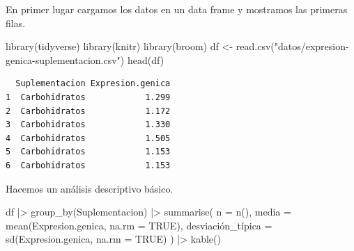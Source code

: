 \documentclass[
  a4paper,
]{scrreport}
\newenvironment{Shaded}{\begin{snugshade}}{\end{snugshade}}
\newcommand{\AttributeTok}[1]{\textcolor[rgb]{0.40,0.45,0.13}{#1}}
\newcommand{\ConstantTok}[1]{\textcolor[rgb]{0.56,0.35,0.01}{#1}}
\newcommand{\FunctionTok}[1]{\textcolor[rgb]{0.28,0.35,0.67}{#1}}
\newcommand{\NormalTok}[1]{\textcolor[rgb]{0.00,0.23,0.31}{#1}}
\newcommand{\OtherTok}[1]{\textcolor[rgb]{0.00,0.23,0.31}{#1}}
\newcommand{\SpecialCharTok}[1]{\textcolor[rgb]{0.37,0.37,0.37}{#1}}
\newcommand{\StringTok}[1]{\textcolor[rgb]{0.13,0.47,0.30}{#1}}
\theoremstyle{definition}
\theoremstyle{remark}
\begin{document}
\begin{tcolorbox}[enhanced jigsaw, breakable, opacityback=0, colbacktitle=quarto-callout-tip-color!10!white, colframe=quarto-callout-tip-color-frame, left=2mm, titlerule=0mm, coltitle=black, colback=white, bottomtitle=1mm, toptitle=1mm, opacitybacktitle=0.6, title=\textcolor{quarto-callout-tip-color}{\faLightbulb}\hspace{0.5em}{Solución}, leftrule=.75mm, bottomrule=.15mm, toprule=.15mm, rightrule=.15mm, arc=.35mm]

En primer lugar cargamos los datos en un data frame y mostramos las
primeras filas.

\begin{Shaded}
\begin{Highlighting}[]
\FunctionTok{library}\NormalTok{(tidyverse)}
\FunctionTok{library}\NormalTok{(knitr)}
\FunctionTok{library}\NormalTok{(broom)}
\NormalTok{df }\OtherTok{\textless{}{-}} \FunctionTok{read.csv}\NormalTok{(}\StringTok{"datos/expresion{-}genica{-}suplementacion.csv"}\NormalTok{)}
\FunctionTok{head}\NormalTok{(df)}
\end{Highlighting}
\end{Shaded}

\begin{verbatim}
  Suplementacion Expresion.genica
1  Carbohidratos            1.299
2  Carbohidratos            1.172
3  Carbohidratos            1.330
4  Carbohidratos            1.505
5  Carbohidratos            1.153
6  Carbohidratos            1.153
\end{verbatim}

Hacemos un análisis descriptivo básico.

\begin{Shaded}
\begin{Highlighting}[]
\NormalTok{df }\SpecialCharTok{|\textgreater{}} 
    \FunctionTok{group\_by}\NormalTok{(Suplementacion) }\SpecialCharTok{|\textgreater{}} 
    \FunctionTok{summarise}\NormalTok{(}
        \AttributeTok{n =} \FunctionTok{n}\NormalTok{(),}
        \AttributeTok{media =} \FunctionTok{mean}\NormalTok{(Expresion.genica, }\AttributeTok{na.rm =} \ConstantTok{TRUE}\NormalTok{),}
\NormalTok{        desviación\_típica }\OtherTok{=} \FunctionTok{sd}\NormalTok{(Expresion.genica, }\AttributeTok{na.rm =} \ConstantTok{TRUE}\NormalTok{)}
\NormalTok{    ) }\SpecialCharTok{|\textgreater{}} 
    \FunctionTok{kable}\NormalTok{()}
\end{Highlighting}
\end{Shaded}


\end{tcolorbox}
\end{document}
